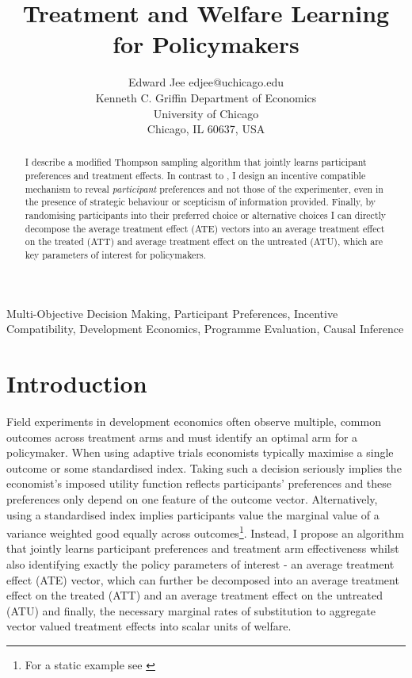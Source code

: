 \documentclass[twoside,11pt]{article}
\begin{document}
\title{
  Treatment and Welfare Learning for Policymakers
}

\author{\name Edward Jee \email edjee@uchicago.edu \\
       \addr Kenneth C. Griffin Department of Economics\\
       University of Chicago\\
       Chicago, IL 60637, USA}


\maketitle

\begin{abstract}%
I describe a modified Thompson sampling algorithm that jointly learns participant preferences and treatment 
effects. In contrast to \cite{lin2022preference}, I design an incentive 
compatible mechanism to reveal \emph{participant} preferences and not those of 
the experimenter, even in the presence of strategic behaviour 
or scepticism of information 
provided. Finally, by randomising 
participants into their preferred choice or alternative choices I can directly 
decompose the average treatment effect (ATE) vectors into an average treatment 
effect on the treated (ATT) and average treatment effect on the untreated (ATU), 
which are key parameters of interest for policymakers. 
\end{abstract}

\begin{keywords}
 Multi-Objective Decision Making, Participant Preferences, Incentive Compatibility, 
 Development Economics, Programme Evaluation, Causal Inference 
\end{keywords}

\section{Introduction}

Field experiments in development economics often observe multiple, common outcomes 
across treatment arms and must identify an optimal arm for a policymaker. 
 When using adaptive trials economists typically maximise a single outcome or 
 some standardised index. Taking such a decision seriously 
implies the economist's imposed utility function reflects participants' preferences 
and these preferences only depend on one feature of the outcome vector. Alternatively, 
using a standardised index implies 
participants value the marginal value of a variance weighted good equally across 
outcomes\footnote{For a static example see \cite{ashraf2010a,blattman2017a,bandiera2017a}}. Instead, I propose an algorithm that jointly learns participant 
preferences and treatment arm effectiveness whilst also identifying exactly the 
policy parameters of interest - an average treatment effect (ATE) vector, which 
can further be decomposed into an average treatment effect on the treated (ATT) and 
an average treatment effect on the untreated (ATU) and finally, the necessary marginal 
rates of substitution to 
aggregate vector valued treatment effects into scalar units of  welfare. 
\end{document}

